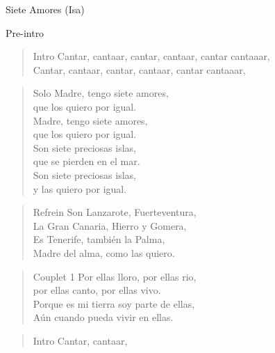 \begin{song}[vals]{Siete Amores (Isa)}
\begin{instrumental}{Pre-intro}
   \\
   
\end{instrumental}

\begin{verse}{Intro}
Cantar, cantaar, cantar, cantaar, cantar cantaaar,\\
Cantar, cantaar, cantar, cantaar, cantar cantaaar,\\
\end{verse}

\begin{verse}{Solo}
Madre, tengo siete amores,\\
que los quiero por igual.\\
Madre, tengo siete amores,\\
que los quiero por igual.\\
Son siete preciosas islas,\\
que se pierden en el mar.\\
Son siete preciosas islas,\\
y las quiero por igual.\hspace{1.5em}\hspace{1.5em}\\
\end{verse}
\begin{verse}{Refrein}
Son Lanzarote, Fuerteventura,\\
La Gran Canaria, Hierro y Gomera,\\
Es Tenerife, también la Palma,\\
Madre del alma, como las quiero.\\
\end{verse}
\begin{verse}{Couplet 1}
Por ellas lloro, por ellas rio,\\
por ellas canto, por ellas vivo.\\
Porque es mi tierra soy parte de ellas,\\
Aún cuando pueda vivir en ellas.\hspace{2.5em}\hspace{1.5em}\\
\end{verse}
\begin{verse}{Intro}
Cantar, cantaar,
\end{verse}
\end{song}
